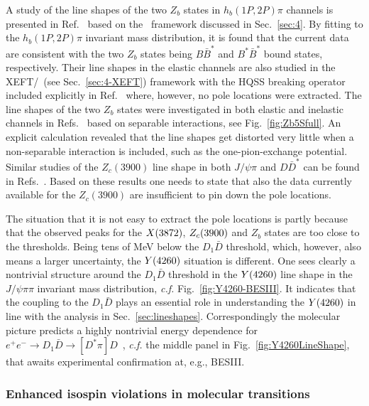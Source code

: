 A study of the line shapes of the two $Z_b$ states in $h_b(1P,2P)\pi$ channels
is presented in Ref.~\cite{Cleven:2011gp} based on the \nreft~framework
discussed in Sec.~\ref{sec:4}. By fitting to the $h_b(1P,2P)\pi$ invariant mass
distribution, it is found that the current data are consistent with the two
$Z_b$ states being $B\bar{B}^*$ and $B^*\bar{B}^*$ bound states, respectively.
Their line shapes in the elastic channels are also studied in the
XEFT/\nreftii~(see Sec.~\ref{sec:4-XEFT}) framework with the HQSS breaking
operator included explicitly in Ref.~\cite{Mehen:2013mva} where, however, no
pole locations were extracted. The line shapes of the two $Z_b$ states were
investigated in both elastic and inelastic channels in
Refs.~\cite{Hanhart:2015cua,Guo:2016bjq} based on separable
interactions, see Fig.~\ref{fig:Zb5Sfull}. An
explicit calculation revealed that the line shapes get distorted very little
when a non-separable interaction is included, such as the one-pion-exchange
potential. Similar studies of the $Z_c(3900)$ line shape in both $J/\psi\pi$ and
$D\bar D^*$ can be found in
Refs.~\cite{Albaladejo:2015lob,Zhou:2015jta,Pilloni:2016obd}. Based on these
results one needs to state that  also the data currently available for the
$Z_c(3900)$ are insufficient to pin down the pole locations.


The situation that it is not easy to extract the pole locations is partly
because that the observed peaks for the $X(3872)$, $Z_c(3900)$ and $Z_b$ states are too
close to the  thresholds. Being tens of MeV below the $D_1\bar D$ threshold,
which, however, also means a larger uncertainty, the $Y(4260)$ situation is
different. One sees clearly a nontrivial structure around the $D_1\bar D$
threshold in the $Y(4260)$ line shape in the $J/\psi \pi\pi$ invariant mass
distribution, {\sl c.f.} Fig.~\ref{fig:Y4260-BESIII}. It indicates that the
coupling to the $D_1\bar D$ plays an essential role in understanding the $Y(4260)$ in
line with the analysis in Sec.~\ref{sec:lineshapes}.
Correspondingly the molecular picture predicts a highly nontrivial energy
dependence for $e^+e^-\to D_1\bar D\to [D^*\pi]D$~\cite{Cleven:2013mka},
{\sl c.f.} the middle panel in Fig.~\ref{fig:Y4260LineShape}, that awaits
experimental confirmation at, e.g., BESIII.


\subsubsection{Enhanced isospin violations in molecular transitions}
\label{sec:isospinviol}


